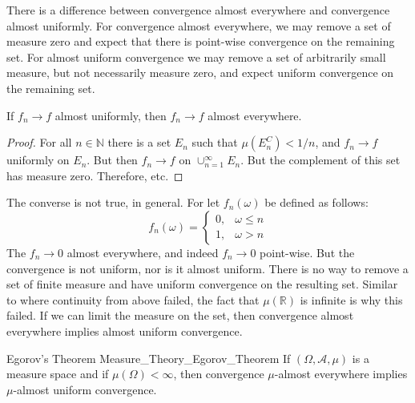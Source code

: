\documentclass[crop=false,class=book,oneside]{standalone}                      %
\begin{document}
        There is a difference between convergence almost
        everywhere and convergence almost uniformly. For
        convergence almost everywhere, we may remove a set
        of measure zero and expect that there is point-wise
        convergence on the remaining set. For almost uniform
        convergence we may remove a set of arbitrarily small
        measure, but not necessarily measure zero, and expect
        uniform convergence on the remaining set.
        \begin{theorem}
            If $f_{n}\rightarrow{f}$ almost uniformly,
            then $f_{n}\rightarrow{f}$ almost everywhere.
        \end{theorem}
        \begin{proof}
            For all $n\in\mathbb{N}$ there is a set
            $E_{n}$ such that $\mu(E_{n}^{C})<1/n$, and
            $f_{n}\rightarrow{f}$ uniformly on $E_{n}$.
            But then $f_{n}\rightarrow{f}$ on
            $\cup_{n=1}^{\infty}E_{n}$. But the complement
            of this set has measure zero. Therefore, etc.
        \end{proof}
        The converse is not true, in general. For let
        $f_{n}(\omega)$ be defined as follows:
        \begin{equation}
            f_{n}(\omega)=
            \begin{cases}
                0,&\omega\leq{n}\\
                1,&\omega>n
            \end{cases}
        \end{equation}
        The $f_{n}\rightarrow{0}$ almost everywhere, and
        indeed $f_{n}\rightarrow{0}$ point-wise. But
        the convergence is not uniform, nor is it
        almost uniform. There is no way to remove a set of
        finite measure and have uniform convergence on the
        resulting set. Similar to where continuity from above
        failed, the fact that $\mu(\mathbb{R})$ is infinite
        is why this failed. If we can limit the measure on
        the set, then convergence almost everywhere implies
        almost uniform convergence.
        \begin{ftheorem}{Egorov's Theorem}
                        {Measure_Theory_Egorov_Theorem}
            If $(\Omega,\mathcal{A},\mu)$ is a measure
            space and if $\mu(\Omega)<\infty$, then
            convergence $\mu$-almost everywhere implies
            $\mu$-almost uniform convergence.
        \end{ftheorem}
\end{document}
